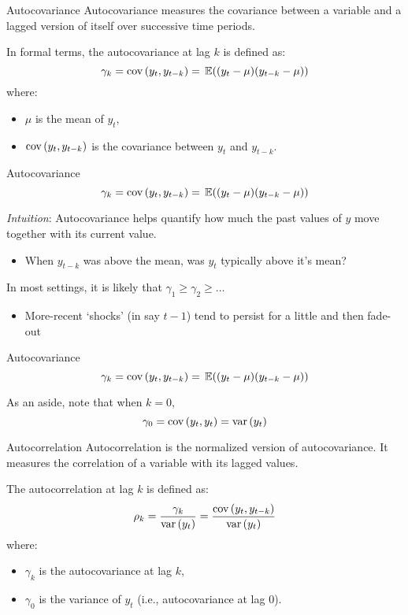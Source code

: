 \documentclass[aspectratio=169,t,11pt,table]{beamer}
\begin{document}
\begin{frame}{Autocovariance}
  \alert{Autocovariance} measures the covariance between a variable and a lagged version of itself over successive time periods.

  \bigskip
  In formal terms, the autocovariance at lag $k$ is defined as:
  $$
    \gamma_k = \cov{y_t, y_{t-k}} = \expec{(y_t - \mu)(y_{t-k} - \mu)}
  $$
  where:
  \begin{itemize}
    \item $\mu$ is the mean of $y_t$,
    \item $\cov{y_t, y_{t-k}}$ is the covariance between $y_t$ and $y_{t-k}$.
  \end{itemize}
\end{frame}

\begin{frame}{Autocovariance}
  \vspace*{-\bigskipamount}
  $$
    \gamma_k = \cov{y_t, y_{t-k}} = \expec{(y_t - \mu)(y_{t-k} - \mu)}
  $$

  \emph{Intuition}: Autocovariance helps quantify how much the past values of $y$ move together with its current value.
  \begin{itemize}
    \item When $y_{t-k}$ was above the mean, was $y_t$ typically above it's mean?
  \end{itemize}

  \bigskip
  \pause
  In most settings, it is likely that $\gamma_1 \geq \gamma_2 \geq \dots$
  \begin{itemize}
    \item More-recent `shocks' (in say $t-1$) tend to persist for a little and then fade-out
  \end{itemize}
\end{frame}

\begin{frame}{Autocovariance}
  \vspace*{-\bigskipamount}
  $$
    \gamma_k = \cov{y_t, y_{t-k}} = \expec{(y_t - \mu)(y_{t-k} - \mu)}
  $$

  \bigskip
  As an aside, note that when $k = 0$, 
  $$
    \gamma_0 = \cov{y_t, y_t} = \var{y_t}
  $$
\end{frame}

\begin{frame}{Autocorrelation}
  \alert{Autocorrelation} is the normalized version of autocovariance. It measures the correlation of a variable with its lagged values.

  \bigskip
  The autocorrelation at lag $k$ is defined as:
  $$
    \rho_k = \frac{\gamma_k}{\var{y_t}} = \frac{\cov{y_t, y_{t-k}}}{\var{y_t}}
  $$
  where:
  \begin{itemize}
    \item $\gamma_k$ is the autocovariance at lag $k$,
    \item $\gamma_0$ is the variance of $y_t$ (i.e., autocovariance at lag 0).
  \end{itemize}
\end{frame}
\end{document}
